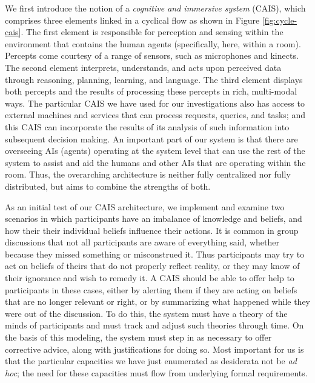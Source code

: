 We first introduce the notion of a \emph{cognitive and immersive
  system} (CAIS), which comprises three elements linked in a cyclical
flow as shown in Figure \ref{fig:cycle-cais}.  The first element is
responsible for perception and sensing within the environment that
contains the human agents (specifically, here, within a room).
Percepts come courtesy of a range of sensors, such as microphones and
kinects.  The second element interprets, understands, and acts upon
perceived data through reasoning, planning, learning, and language.
The third element displays both percepts and the results of processing
these percepts in rich, multi-modal ways.  The particular CAIS we have
used for our investigations
%
also has access to external machines and services that can process
requests, queries, and tasks; and this CAIS can incorporate the
results of its analysis of such information into subsequent decision
making.  An important part of our system is that there are overseeing
AIs (agents) operating at the system level that can use the rest of
the system to assist and aid the humans and other AIs that are
operating within the room.  Thus, the overarching architecture is
neither fully centralized nor fully distributed, but aims to combine
the strengths of both.

As an initial test of our CAIS architecture, we implement and examine
two scenarios in which participants have an imbalance of knowledge and
beliefs, and how their their individual beliefs influence their actions.
It is common in group discussions that not all participants are aware
of everything said, whether because they missed something or
misconstrued it.  Thus participants may try to act on beliefs of
theirs that do not properly reflect reality, or they may know of their
ignorance and wish to remedy it.  A CAIS should be able to offer help
to participants in these cases, either by alerting them if they are
acting on beliefs that are no longer relevant or right, or by
summarizing what happened while they were out of the discussion.  To
do this, the system must have a theory of the minds
\citep{PremackWoodruff78,frith2005,ka_sb_scc_seqcalc} of participants
and must track and adjust such theories through time.  On the basis of
this modeling, the system must
step in as necessary to offer corrective advice, along with
justifications for doing so.  Most important for us is that the
particular capacities we have just enumerated as desiderata not be
\textit{ad hoc}; the need for these capacities must flow from
underlying formal requirements.

